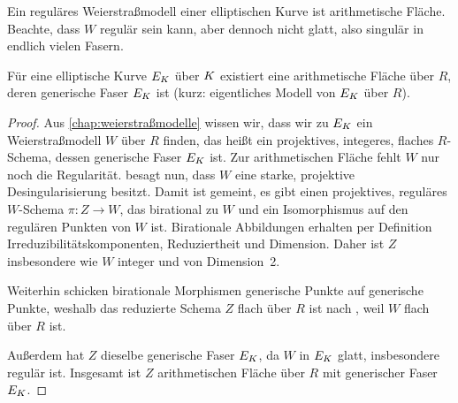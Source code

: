 \begin{Beispiel}\label{bsp:regweierstraßmodell}
  Ein reguläres Weierstraßmodell einer elliptischen Kurve ist
  arithmetische Fläche.
  Beachte, dass $W$ regulär sein kann, aber dennoch nicht glatt, also
  singulär in endlich vielen Fasern.
\end{Beispiel}

\begin{Satz}\label{thm:exarithfl}
  Für eine elliptische Kurve $E_{K}$ über $K$ existiert eine
  arithmetische Fläche über $R$, deren generische Faser $E_{K}$ ist
  (kurz: eigentliches Modell von $E_{K}$ über $R$).
  \begin{proof}
    Aus \autoref{chap:weierstraßmodelle} wissen wir, dass wir zu $E_{K}$
    ein Weierstraßmodell $W$ über $R$ finden, das heißt ein projektives,
    integeres, flaches $R$-Schema, dessen generische Faser $E_{K}$
    ist. Zur arithmetischen Fläche fehlt $W$ nur noch die
    Regularität.
    \cite[Corollary 8.3.51]{liu} besagt nun, dass $W$ eine starke,
    projektive Desingularisierung besitzt. Damit ist gemeint, es gibt
    einen projektives, reguläres $W$-Schema $\pi\colon Z\to W$, das
    birational zu $W$ und ein Isomorphismus auf den regulären Punkten
    von $W$ ist.
    Birationale Abbildungen erhalten per Definition
    Irreduzibilitätskomponenten, Reduziertheit und Dimension.
    Daher ist $Z$ insbesondere wie $W$ integer
    und von Dimension~2.

    Weiterhin schicken birationale Morphismen generische Punkte auf
    generische Punkte, weshalb das reduzierte Schema $Z$ flach über
    $R$ ist nach \cite[Proposition III.9.7]{hartshorne}, weil
    $W$ flach über $R$ ist.

    Außerdem hat $Z$ dieselbe generische Faser $E_{K}$, da
    $W$ in $E_{K}$ glatt, insbesondere regulär ist.
    Insgesamt ist $Z$ arithmetischen Fläche über $R$ mit
    generischer Faser $E_{K}$.
  \end{proof}
\end{Satz}

